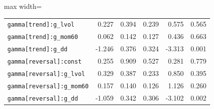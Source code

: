 \begin{table}[!htbp]
\begin{adjustbox}{max width=\textwidth}
\begin{tabular}{lrrrrr}
\texttt{gamma[trend]:g\_lvol} & 0.227 & 0.394 & 0.239 & 0.575 & 0.565\\
\texttt{gamma[trend]:g\_mom60} & 0.062 & 0.142 & 0.127 & 0.436 & 0.663\\
\texttt{gamma[trend]:g\_dd} & -1.246 & 0.376 & 0.324 & -3.313 & 0.001\\
\texttt{gamma[reversal]:const} & 0.255 & 0.909 & 0.527 & 0.281 & 0.779\\
\texttt{gamma[reversal]:g\_lvol} & 0.329 & 0.387 & 0.233 & 0.850 & 0.395\\
\texttt{gamma[reversal]:g\_mom60} & 0.157 & 0.140 & 0.126 & 1.126 & 0.260\\
\texttt{gamma[reversal]:g\_dd} & -1.059 & 0.342 & 0.306 & -3.102 & 0.002\\
\bottomrule
\end{tabular}
\end{adjustbox}
\end{table}